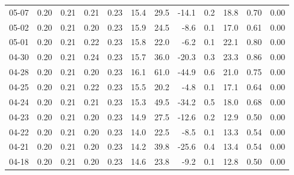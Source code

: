 \begin{threeparttable}
{\begin{tabular}{lrrrrrrrrrrr}
  05-07 &          0.20 &          0.21 &          0.21 &        0.23 &                15.4 &                29.5 &      -14.1 &                 0.2 &             18.8 &            0.70 &                   0.00 \\
  05-02 &          0.20 &          0.21 &          0.20 &        0.23 &                15.9 &                24.5 &       -8.6 &                 0.1 &             17.0 &            0.61 &                   0.00 \\
  05-01 &          0.20 &          0.21 &          0.22 &        0.23 &                15.8 &                22.0 &       -6.2 &                 0.1 &             22.1 &            0.80 &                   0.00 \\
  04-30 &          0.20 &          0.21 &          0.24 &        0.23 &                15.7 &                36.0 &      -20.3 &                 0.3 &             23.3 &            0.86 &                   0.00 \\
  04-28 &          0.20 &          0.21 &          0.20 &        0.23 &                16.1 &                61.0 &      -44.9 &                 0.6 &             21.0 &            0.75 &                   0.00 \\
  04-25 &          0.20 &          0.21 &          0.22 &        0.23 &                15.5 &                20.2 &       -4.8 &                 0.1 &             17.1 &            0.64 &                   0.00 \\
  04-24 &          0.20 &          0.21 &          0.21 &        0.23 &                15.3 &                49.5 &      -34.2 &                 0.5 &             18.0 &            0.68 &                   0.00 \\
  04-23 &          0.20 &          0.21 &          0.20 &        0.23 &                14.9 &                27.5 &      -12.6 &                 0.2 &             12.9 &            0.50 &                   0.00 \\
  04-22 &          0.20 &          0.21 &          0.20 &        0.23 &                14.0 &                22.5 &       -8.5 &                 0.1 &             13.3 &            0.54 &                   0.00 \\
  04-21 &          0.20 &          0.21 &          0.20 &        0.23 &                14.2 &                39.8 &      -25.6 &                 0.4 &             13.4 &            0.54 &                   0.00 \\
  04-18 &          0.20 &          0.21 &          0.20 &        0.23 &                14.6 &                23.8 &       -9.2 &                 0.1 &             12.8 &            0.50 &                   0.00 \\

\end{tabular}}
\end{threeparttable}

